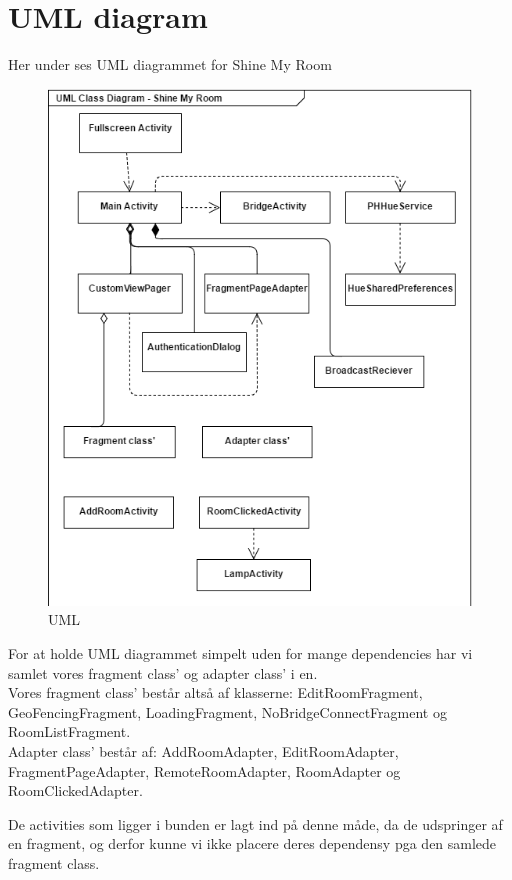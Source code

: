 \section{UML diagram}
Her under ses UML diagrammet for Shine My Room
\begin{figure}[H]
	\centering
	\includegraphics[width=0.6\linewidth, height=0.7\linewidth]{Design/UMLDiagram}
	\caption{UML}
	\label{fig:UML Diagram}
\end{figure}
For at holde UML diagrammet simpelt uden for mange dependencies har vi samlet vores fragment class' og adapter class' i en. \\
Vores fragment class' består altså af klasserne: EditRoomFragment, GeoFencingFragment, LoadingFragment, NoBridgeConnectFragment og RoomListFragment.\\
Adapter class' består af: AddRoomAdapter, EditRoomAdapter, FragmentPageAdapter, RemoteRoomAdapter, RoomAdapter og RoomClickedAdapter.

De activities som ligger i bunden er lagt ind på denne måde, da de udspringer af en fragment, og derfor kunne vi ikke placere deres dependensy pga den samlede fragment class.
\newpage

